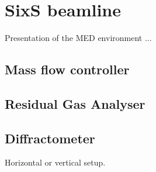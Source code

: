 \section{SixS beamline}

Presentation of the MED environment ... 

\subsection{Mass flow controller}

\subsection{Residual Gas Analyser}

\subsection{Diffractometer}

Horizontal or vertical setup.
